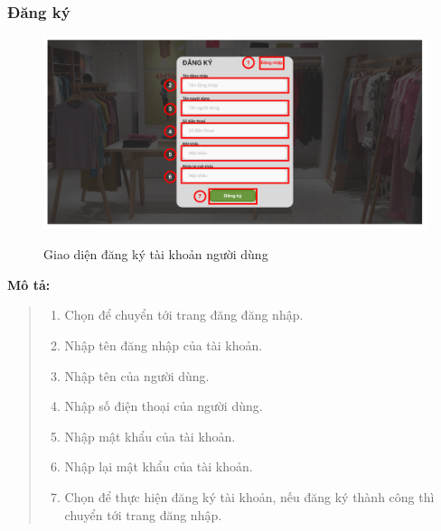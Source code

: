     \subsubsection{Đăng ký}
    \begin{figure}[!htp]
        \centering
        \includegraphics[width=5in]{img/UI/customer/register.png}
        \label{2}
        \newline
        \caption{Giao diện đăng ký tài khoản người dùng}
    \end{figure}
    \textbf{Mô tả:}  
    \begin{quote}
        \begin{enumerate}
            \item Chọn để chuyển tới trang đăng đăng nhập.
            \item Nhập tên đăng nhập của tài khoản.
            \item Nhập tên của người dùng.
            \item Nhập số điện thoại của người dùng.
            \item Nhập mật khẩu của tài khoản.
            \item Nhập lại mật khẩu của tài khoản.
            \item Chọn để thực hiện đăng ký tài khoản, nếu đăng ký thành công thì chuyển tới trang đăng nhập.
        \end{enumerate}
    \end{quote}
    
    

